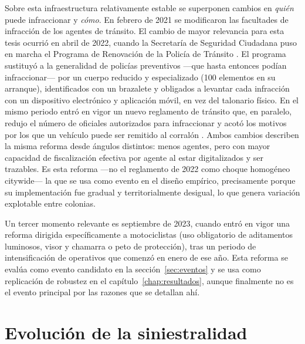 Sobre esta infraestructura relativamente estable se superponen cambios en
\emph{quién} puede infraccionar y \emph{cómo}. En febrero de 2021 se
modificaron las facultades de infracción de los agentes de tránsito. El
cambio de mayor relevancia para esta tesis ocurrió en abril de 2022, cuando
la Secretaría de Seguridad Ciudadana puso en marcha el Programa de Renovación
de la Policía de Tránsito \citep{elfinanciero2022}. El programa sustituyó a
la generalidad de policías preventivos —que hasta entonces podían
infraccionar— por un cuerpo reducido y especializado (100 elementos en su
arranque), identificados con un brazalete y obligados a levantar cada
infracción con un dispositivo electrónico y aplicación móvil, en vez del
talonario físico. En el mismo periodo entró en vigor un nuevo reglamento de
tránsito que, en paralelo, redujo el número de oficiales autorizados para
infraccionar y acotó los motivos por los que un vehículo puede ser remitido
al corralón \citep{galvan2022}. Ambos cambios describen la misma reforma
desde ángulos distintos: menos agentes, pero con mayor capacidad de
fiscalización efectiva por agente al estar digitalizados y ser trazables.
Es esta reforma —no el reglamento de 2022 como choque homogéneo citywide— la
que se usa como evento en el diseño empírico, precisamente porque su
implementación fue gradual y territorialmente desigual, lo que genera
variación explotable entre colonias.

Un tercer momento relevante es septiembre de 2023, cuando entró en vigor una
reforma dirigida específicamente a motociclistas (uso obligatorio de
aditamentos luminosos, visor y chamarra o peto de protección), tras un
periodo de intensificación de operativos que comenzó en enero de ese año.
Esta reforma se evalúa como evento candidato en la
sección~\ref{sec:eventos} y se usa como replicación de robustez en el
capítulo~\ref{chap:resultados}, aunque finalmente no es el evento principal
por las razones que se detallan ahí.

\section{Evolución de la siniestralidad}
\label{sec:contexto_siniestralidad}

